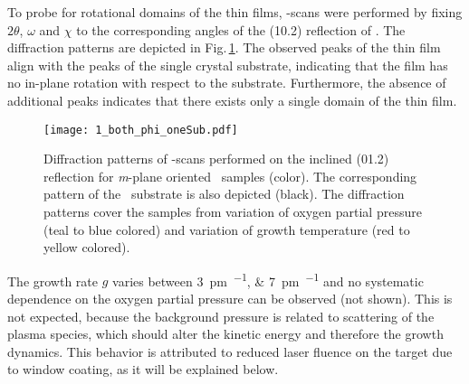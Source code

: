 To probe for rotational domains of the thin films, \textphi-scans were performed by fixing $2\theta$, $\omega$ and $\chi$ to the corresponding angles of the (10.2) reflection of \cro.
The diffraction patterns are depicted in Fig.\,\ref{Fig:Results_1_phiScan}.
The observed peaks of the thin film align with the peaks of the single crystal substrate, indicating that the film has no in-plane rotation with respect to the substrate.
Furthermore, the absence of additional peaks indicates that there exists only a single domain of the thin film.
\begin{figure}
    \centering
    \texttt{[image: 1\_both\_phi\_oneSub.pdf]}
    \caption{
        Diffraction patterns of \textphi-scans performed on the inclined (01.2) reflection for \textit{m}-plane oriented \cro\ samples (color).
        The corresponding pattern of the \alo\ substrate is also depicted (black).
        The diffraction patterns cover the samples from variation of oxygen partial pressure (teal to blue colored) and variation of growth temperature (red to yellow colored).
    }
    \label{Fig:Results_1_phiScan}
\end{figure}

The growth rate $g$ varies between \qtylist{3;7}{\pm\per\pulse} and no systematic dependence on the oxygen partial pressure can be observed (not shown).
This is not expected, because the background pressure is related to scattering of the plasma species, which should alter the kinetic energy and therefore the growth dynamics.
This behavior is attributed to reduced laser fluence on the target due to window coating, as it will be explained below.

